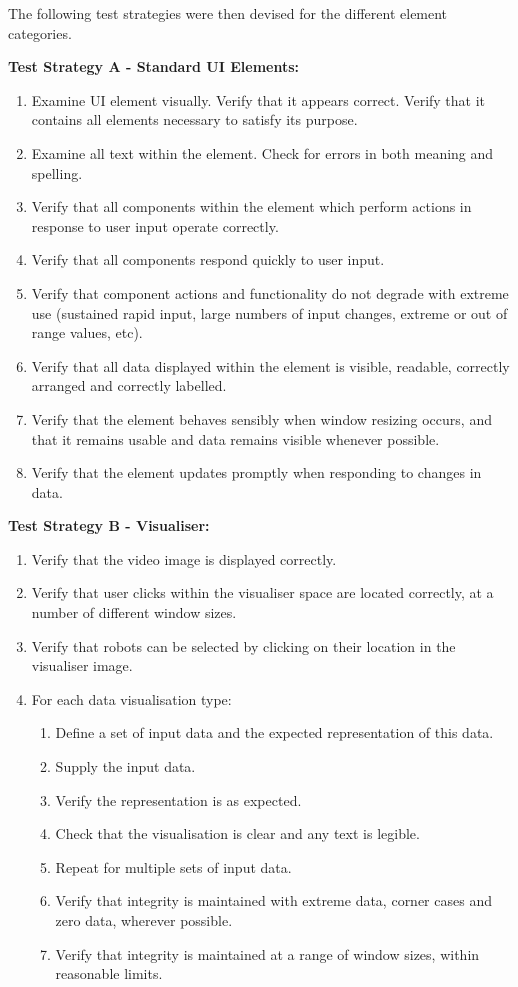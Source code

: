 \noindent The following test strategies were then devised for the different element categories.

\textbf{Test Strategy A - Standard UI Elements:}

\begin{enumerate}
 \item Examine UI element visually. Verify that it appears correct. Verify that it contains all elements necessary to satisfy its purpose.
 \item Examine all text within the element. Check for errors in both meaning and spelling.
 \item Verify that all components within the element which perform actions in response to user input operate correctly.
 \item Verify that all components respond quickly to user input.
 \item Verify that component actions and functionality do not degrade with extreme use (sustained rapid input, large numbers of input changes, extreme or out of range values, etc).
 \item Verify that all data displayed within the element is visible, readable, correctly arranged and correctly labelled.
 \item Verify that the element behaves sensibly when window resizing occurs, and that it remains usable and data remains visible whenever possible.
 \item Verify that the element updates promptly when responding to changes in data.
\end{enumerate}

\textbf{Test Strategy B - Visualiser:}

\begin{enumerate}
 \item Verify that the video image is displayed correctly.
 \item Verify that user clicks within the visualiser space are located correctly, at a number of different window sizes.
 \item Verify that robots can be selected by clicking on their location in the visualiser image.
 \item For each data visualisation type:
 \begin{enumerate}
  \item Define a set of input data and the expected representation of this data.
  \item Supply the input data.
  \item Verify the representation is as expected.
  \item Check that the visualisation is clear and any text is legible.
  \item Repeat for multiple sets of input data.
  \item Verify that integrity is maintained with extreme data, corner cases and zero data, wherever possible.
  \item Verify that integrity is maintained at a range of window sizes, within reasonable limits.
 \end{enumerate}
\end{enumerate}

